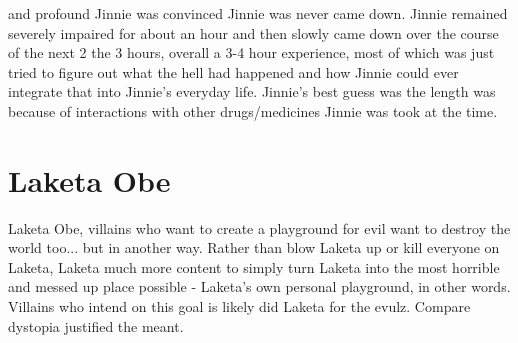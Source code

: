 \documentclass[12pt]{book}
\begin{document}
and profound Jinnie was convinced Jinnie was never came down. Jinnie remained severely impaired for about an hour and then slowly came down over the course of the next 2 the 3 hours, overall a 3-4 hour experience, most of which was just tried to figure out what the hell had happened and how Jinnie could ever integrate that into Jinnie's everyday life. Jinnie's best guess was the length was because of interactions with other drugs/medicines Jinnie was took at the time.



\chapter{Laketa Obe}

Laketa Obe, villains who want to create a playground for evil want to destroy the world too... but in another way. Rather than blow Laketa up or kill everyone on Laketa, Laketa much more content to simply turn Laketa into the most horrible and messed up place possible - Laketa's own personal playground, in other words. Villains who intend on this goal is likely did Laketa for the evulz. Compare dystopia justified the meant.
\end{document}
